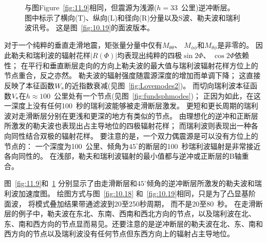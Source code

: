 \begin{figure}[!b]
\begin{center}
\end{center}
\caption[surface seismo2]{
\label{fig:11.10}
与图Figure~\protect\ref{fig:11.9}相同，但震源为浅源($h=33$~公里)逆冲断层。
图中标示了横向(T)、纵向(L)和径向(R)分量以及S波、勒夫波和瑞利波讯号。
这是图~\protect\ref{fig:10.19}的面波版本。}
\end{figure}

对于一个纯粹的垂直走滑地震，矩张量分量中仅有$M_{\theta\theta}$、 $M_{\phi\phi}$和$M_{\theta\phi}$是非零的。 
因此勒夫和瑞利波的辐射花样$|R(\Phi)|$均表现出纯粹的四极$\sin2\Phi$、
$\cos2\Phi$依赖性；
在平行和垂直断层走向的方向上勒夫波的最大值与瑞利波辐射花样方位上的节点重合，反之亦然。
勒夫波的辐射强度随震源深度的增加而单调下降；
这直接反映了本征函数$W_{\rm s}$的近指数衰减(见图~\ref{fig:Lovemodes2})。
而切向瑞利波本征函数$V_{\rm s}$在$h\approx 100$~公里处有一个节点(见图~\ref{fig:fundsphmodes})；
正因为如此，在这一深度上没有任何100~秒的瑞利波能够被走滑断层激发。
更短和更长周期的瑞利波对走滑断层分别在更浅和更深的地方有类似的节点。
由理想化的逆冲和正断层所激发的勒夫波也表现出占主导地位的四极辐射花样；
而瑞利波则表现出一种各向同性结合双极的辐射花样。
要注意的是，一个双力偶震源是可以没有方位上的节点的：
一个深度为100~公里、倾角为$45^{\circ}$的断层的100~秒瑞利波辐射是非常接近各向同性的。
在浅部，勒夫和瑞利波辐射的最小值都与逆冲或正断层的B轴重合。

图~\ref{fig:11.9}和~\ref{fig:11.10} 分别显示了由走滑断层和$45^{\circ}$倾角的逆冲断层所激发的勒夫波和瑞利波加速度图。
绘图方式与图~\ref{fig:10.18} 和~\ref{fig:10.19}相同，只是为了凸显基阶面波，
将模式叠加结果带通滤波到20至250秒周期， 而不是20至80~秒。
在走滑断层的例子中，勒夫波在东北、东南、西南和西北方向的节点，以及瑞利波在北、东、南和西方向的节点显而易见。还要注意的是逆冲断层的勒夫波在北、东、南和西方向的节点以及瑞利波没有任何节点但东西方向上的辐射占主导地位。
%
%

